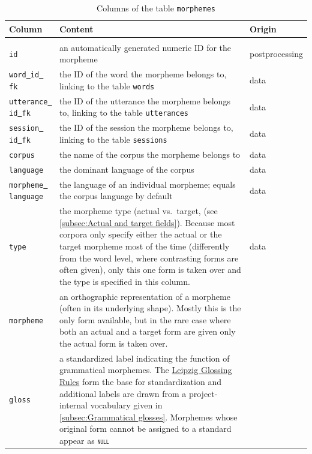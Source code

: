 \documentclass[a4paper, 11pt]{book}
\newcommand{\und}{\underline{{ }}\hspace{0.2mm}}	%
\begin{document}
\begin{longtable}{lp{.5\linewidth}p{.2\linewidth}}
	\toprule
		\textbf{Column} & \textbf{Content} 	& \textbf{Origin} \\
	\midrule
	\endhead
	
	\bottomrule\\[-0.15cm]
	\caption{Columns of the table \texttt{morphemes}}
	\endfoot

		\texttt{id}	 			& an automatically generated numeric ID for the morpheme & postprocessing \\
		
		\texttt{word\und id\und fk} & the ID of the word the morpheme belongs to, linking to the table \texttt{words} & data \\ 
		\texttt{utterance\und id\und fk} & the ID of the utterance the morpheme belongs to, linking to the table \texttt{utterances} & data \\
		\texttt{session\und id\und fk} & the ID of the session the morpheme belongs to, linking to the table \texttt{sessions} & data \\
		\texttt{corpus} 		& the name of the corpus the morpheme belongs to & data \\
		\texttt{language}		& the dominant language of the corpus & data \\
		\texttt{morpheme\und language}	& the language of an individual morpheme; equals the corpus language by default & data \\
		\texttt{type} 			& the morpheme type (actual vs.\ target, (see \autoref{subsec:Actual and target fields}). Because most corpora only
								  specify either the actual or the target morpheme most of the time (differently from the word level, where contrasting 
								  forms are often given), only this one form is taken over and the type is specified in this column. & data \\
		\texttt{morpheme} 		& an orthographic representation of a morpheme (often in its underlying shape). Mostly this is the only form available, 
								  but in the rare case where both an actual and a target form are given only the actual form is taken over. \\
		\texttt{gloss} 			& a standardized label indicating the function of grammatical morphemes. The \href{http://www.eva.mpg.de/lingua/resources/glossing-rules.php}{Leipzig 
								  Glossing Rules} form the base for standardization and additional labels are drawn from a project-internal vocabulary given in 
								  \autoref{subsec:Grammatical glosses}. Morphemes whose original form cannot be assigned to a standard appear as \texttt{\textsc{null}}

\end{longtable}
\end{document}
